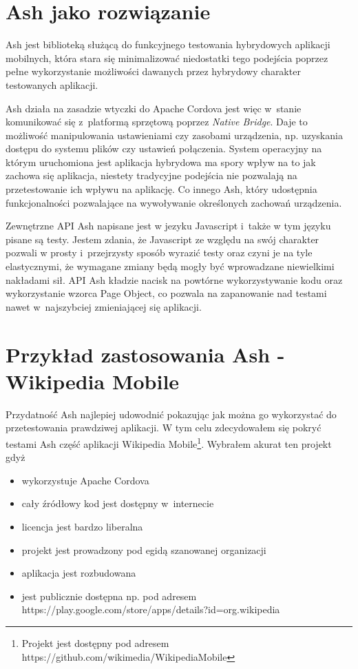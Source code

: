 \documentclass[brudnopis]{xmgr}
\begin{document}
                                                                                                                                                                 
\section{Ash jako rozwiązanie}

Ash jest biblioteką służącą do funkcyjnego testowania hybrydowych aplikacji mobilnych, która stara się minimalizować niedostatki tego podejścia poprzez pełne wykorzystanie możliwości dawanych przez hybrydowy charakter testowanych aplikacji. 

Ash działa na zasadzie wtyczki do Apache Cordova jest więc w~stanie komunikować się z~platformą sprzętową poprzez \textit{Native Bridge}. Daje to możliwość manipulowania ustawieniami czy zasobami urządzenia, np. uzyskania dostępu do systemu plików czy ustawień połączenia. System operacyjny na którym uruchomiona jest aplikacja hybrydowa ma spory wpływ na to jak zachowa się aplikacja, niestety tradycyjne podejścia nie pozwalają na przetestowanie ich wpływu na aplikację. Co innego Ash, który udostępnia funkcjonalności pozwalające na wywoływanie określonych zachowań urządzenia. 

Zewnętrzne API Ash napisane jest w jezyku Javascript i~także w tym języku pisane są testy. Jestem zdania, że Javascript ze względu na swój charakter pozwali w prosty i~przejrzysty sposób wyrazić testy oraz czyni je na tyle elastycznymi, że wymagane zmiany będą mogły być wprowadzane niewielkimi nakładami sił. API Ash kładzie nacisk na powtórne wykorzystywanie kodu oraz wykorzystanie wzorca Page Object, co pozwala na zapanowanie nad testami nawet w~najszybciej zmieniającej się aplikacji. 

\section{Przykład zastosowania Ash - Wikipedia Mobile}

Przydatność Ash najlepiej udowodnić pokazując jak można go wykorzystać do przetestowania prawdziwej aplikacji. W tym celu zdecydowałem się pokryć testami Ash część aplikacji Wikipedia Mobile\footnote{Projekt jest dostępny pod adresem https://github.com/wikimedia/WikipediaMobile}. Wybrałem akurat ten projekt gdyż

\begin{itemize}
  \item wykorzystuje Apache Cordova
  \item cały źródłowy kod jest dostępny w~internecie
  \item licencja jest bardzo liberalna
  \item projekt jest prowadzony pod egidą szanowanej organizacji
  \item aplikacja jest rozbudowana
  \item jest publicznie dostępna np. pod adresem https://play.google.com/store/apps/details?id=org.wikipedia
\end{itemize}
\end{document}
